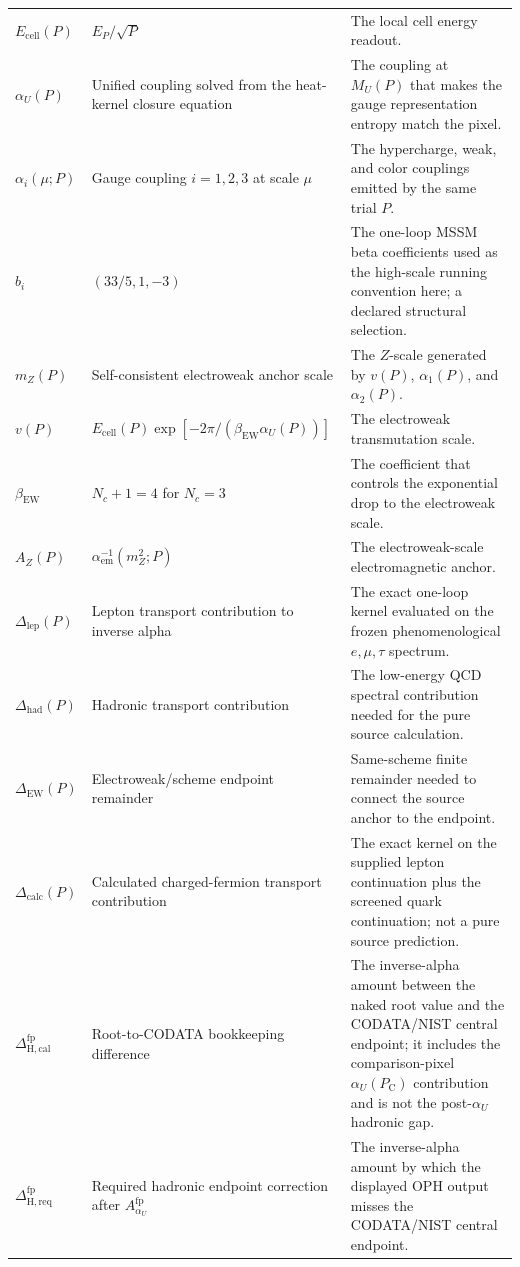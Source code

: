 \documentclass[11pt]{article}
\theoremstyle{remark}
\newcommand{\AZ}{A_Z}
\newcommand{\Ppub}{P_{\mathrm C}}
\newcommand{\Dcalc}{\Delta_{\mathrm{calc}}}
\newcommand{\Dcalib}{\Delta_{\mathrm{H,cal}}}
\newcommand{\Dlep}{\Delta_{\mathrm{lep}}}
\newcommand{\Dhad}{\Delta_{\mathrm{had}}}
\newcommand{\DEW}{\Delta_{\mathrm{EW}}}
\newcommand{\Dhadreq}{\Delta_{\mathrm{H,req}}}
\newcommand{\Nc}{N_c}
\begin{document}
\begin{longtable}{@{}L{0.20\textwidth}L{0.32\textwidth}L{0.38\textwidth}@{}}
\(E_{\mathrm{cell}}(P)\) & \(E_P/\sqrt P\) & The local cell energy readout. \\
\(\alpha_U(P)\) & Unified coupling solved from the heat-kernel closure equation & The coupling at \(M_U(P)\) that makes the gauge representation entropy match the pixel. \\
\(\alpha_i(\mu;P)\) & Gauge coupling \(i=1,2,3\) at scale \(\mu\) & The hypercharge, weak, and color couplings emitted by the same trial \(P\). \\
\(b_i\) & \((33/5,1,-3)\) & The one-loop MSSM beta coefficients used as the high-scale running convention here; a declared structural selection. \\
\(m_Z(P)\) & Self-consistent electroweak anchor scale & The \(Z\)-scale generated by \(v(P)\), \(\alpha_1(P)\), and \(\alpha_2(P)\). \\
\(v(P)\) & \(E_{\mathrm{cell}}(P)\exp[-2\pi/(\beta_{\mathrm{EW}}\alpha_U(P))]\) & The electroweak transmutation scale. \\
\(\beta_{\mathrm{EW}}\) & \(\Nc+1=4\) for \(\Nc=3\) & The coefficient that controls the exponential drop to the electroweak scale. \\
\(\AZ(P)\) & \(\alpha_{\mathrm{em}}^{-1}(m_Z^2;P)\) & The electroweak-scale electromagnetic anchor. \\
\(\Dlep(P)\) & Lepton transport contribution to inverse alpha & The exact one-loop kernel evaluated on the frozen phenomenological \(e,\mu,\tau\) spectrum. \\
\(\Dhad(P)\) & Hadronic transport contribution & The low-energy QCD spectral contribution needed for the pure source calculation. \\
\(\DEW(P)\) & Electroweak/scheme endpoint remainder & Same-scheme finite remainder needed to connect the source anchor to the endpoint. \\
\(\Dcalc(P)\) & Calculated charged-fermion transport contribution & The exact kernel on the supplied lepton continuation plus the screened quark continuation; not a pure source prediction. \\
\(\Dcalib^{\mathrm{fp}}\) & Root-to-CODATA bookkeeping difference & The inverse-alpha amount between the naked root value and the CODATA/NIST central endpoint; it includes the comparison-pixel \(\alpha_U(\Ppub)\) contribution and is not the post-\(\alpha_U\) hadronic gap. \\
\(\Dhadreq^{\mathrm{fp}}\) & Required hadronic endpoint correction after \(A_{\alpha_U}^{\mathrm{fp}}\) & The inverse-alpha amount by which the displayed OPH output misses the CODATA/NIST central endpoint. \\

\end{longtable}
\end{document}
